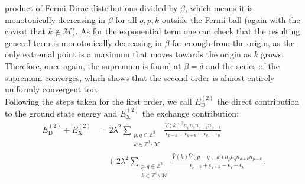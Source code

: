 product of Fermi-Dirac distributions divided by $\beta$, which means it is monotonically
decreasing in $\beta$ for all $q,p,k$ outside the Fermi ball (again with the caveat that
$k\not\in\mathcal{M}$). As for the exponential term one can check that the resulting general
term is monotonically decreasing in $\beta$ far enough from the origin, as the only extremal
point is a maximum that moves towards the origin as $k$ grows. Therefore, once again, the
supremum is found at $\beta=\delta$ and the series of the supremum converges, which shows that
the second order is almost entirely uniformly convergent too.
\\
Following the steps taken for the first order, we call $E^{(2)}_{\mathrm{D}}$ the direct
contribution to the ground state energy and $E^{(2)}_{\mathrm{X}}$ the exchange contribution:
\begin{align*}
	E^{(2)}_{\mathrm{D}} + E^{(2)}_{\mathrm{X}}
	&= 2\lambda^2\sum_{\substack{p,q\in\mathbb{Z}^3\\k\in\mathbb{Z}^3\setminus\mathcal{M}}}
	\frac{\hat{V}(k)^2 n_p n_q n_{q+k} n_{p-k}}{\epsilon_{p-k}+\epsilon_{q+k}-\epsilon_q-\epsilon_p}\\
	&\quad+ 2\lambda^2\sum_{\substack{p,q\in\mathbb{Z}^3\\k\in\mathbb{Z}^3\setminus\mathcal{M}}}
	\frac{\hat{V}(k)\hat{V}(p-q-k) n_p n_q n_{q+k} n_{p-k}}{\epsilon_{p-k}+\epsilon_{q+k}-\epsilon_q-\epsilon_p}.
\end{align*}

